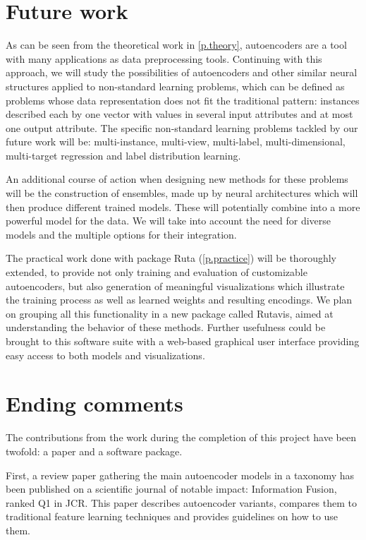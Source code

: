 \documentclass[oneside,openright,titlepage,numbers=noenddot,openany,headinclude,footinclude=true,
cleardoublepage=empty,abstractoff,BCOR=5mm,paper=a4,fontsize=12pt,main=spanish]{scrreprt}
\begin{document}
\chapter{Future work}

As can be seen from the theoretical work in \autoref{p.theory}, autoencoders are a tool with many applications as data preprocessing tools. Continuing with this approach, we will study the possibilities of autoencoders and other similar neural structures applied to non-standard learning problems, which can be defined as problems whose data representation does not fit the traditional pattern: instances described each by one vector with values in several input attributes and at most one output attribute. The specific non-standard learning problems tackled by our future work will be: multi-instance, multi-view, multi-label, multi-dimensional, multi-target regression and label distribution learning.

An additional course of action when designing new methods for these problems will be the construction of ensembles, made up by neural architectures which will then produce different trained models. These will potentially combine into a more powerful model for the data. We will take into account the need for diverse models and the multiple options for their integration.

The practical work done with package Ruta (\autoref{p.practice}) will be thoroughly extended, to provide not only training and evaluation of customizable autoencoders, but also generation of meaningful visualizations which illustrate the training process as well as learned weights and resulting encodings. We plan on grouping all this functionality in a new package called Rutavis, aimed at understanding the behavior of these methods. Further usefulness could be brought to this software suite with a web-based graphical user interface providing easy access to both models and visualizations.


\chapter{Ending comments}

The contributions from the work during the completion of this project have been twofold: a paper and a software package.

First, a review paper gathering the main autoencoder models in a taxonomy has been published on a scientific journal of notable impact: Information Fusion, ranked Q1 in JCR. This paper describes autoencoder variants, compares them to traditional feature learning techniques and provides guidelines on how to use them.
\end{document}
